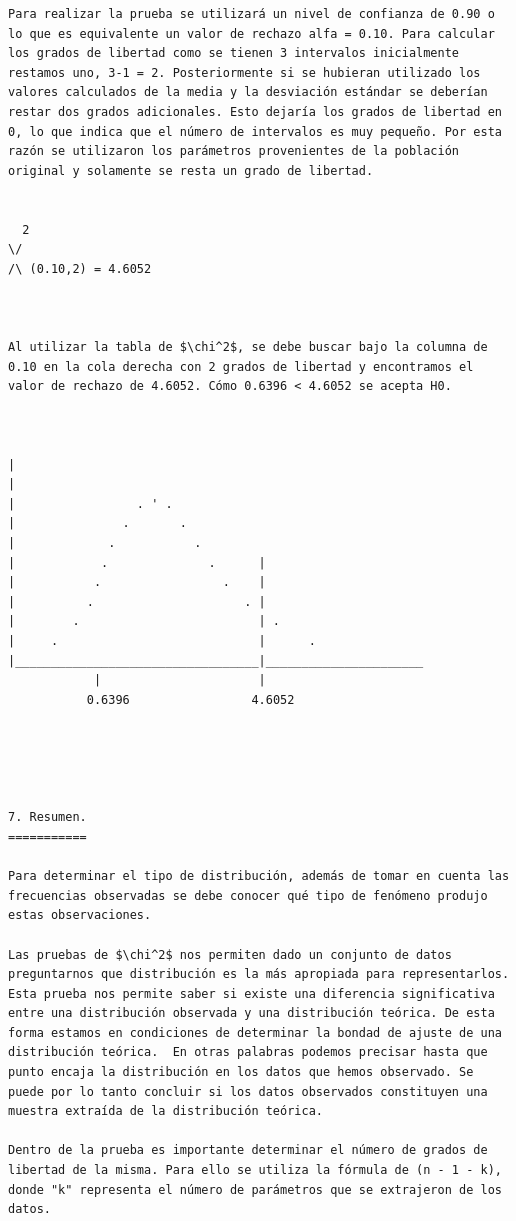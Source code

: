 \begin{verbatim}
Para realizar la prueba se utilizará un nivel de confianza de 0.90 o lo que es equivalente un valor de rechazo alfa = 0.10. Para calcular los grados de libertad como se tienen 3 intervalos inicialmente restamos uno, 3-1 = 2. Posteriormente si se hubieran utilizado los valores calculados de la media y la desviación estándar se deberían restar dos grados adicionales. Esto dejaría los grados de libertad en 0, lo que indica que el número de intervalos es muy pequeño. Por esta razón se utilizaron los parámetros provenientes de la población original y solamente se resta un grado de libertad.


  2
\/
/\ (0.10,2) = 4.6052



Al utilizar la tabla de $\chi^2$, se debe buscar bajo la columna de 0.10 en la cola derecha con 2 grados de libertad y encontramos el valor de rechazo de 4.6052. Cómo 0.6396 < 4.6052 se acepta H0.



|
|
|                 . ' .
|               .       .
|             .           .
|            .              .      |
|           .                 .    |
|          .                     . |
|        .                         | .
|     .                            |      .
|__________________________________|______________________
            |                      |    
           0.6396                 4.6052   





7. Resumen.
===========

Para determinar el tipo de distribución, además de tomar en cuenta las frecuencias observadas se debe conocer qué tipo de fenómeno produjo estas observaciones.

Las pruebas de $\chi^2$ nos permiten dado un conjunto de datos preguntarnos que distribución es la más apropiada para representarlos. Esta prueba nos permite saber si existe una diferencia significativa entre una distribución observada y una distribución teórica. De esta forma estamos en condiciones de determinar la bondad de ajuste de una distribución teórica.  En otras palabras podemos precisar hasta que punto encaja la distribución en los datos que hemos observado. Se puede por lo tanto concluir si los datos observados constituyen una muestra extraída de la distribución teórica.

Dentro de la prueba es importante determinar el número de grados de libertad de la misma. Para ello se utiliza la fórmula de (n - 1 - k), donde "k" representa el número de parámetros que se extrajeron de los datos.




\end{verbatim}
